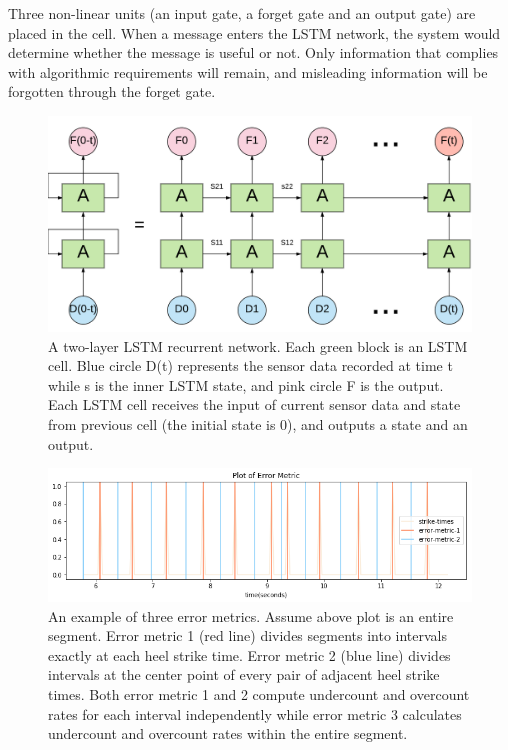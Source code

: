 \documentclass[11pt]{article}
\begin{document}
Three non-linear units (an input gate, a forget gate and an output gate) are placed in the cell. When a message enters the LSTM network, the system would determine whether the message is useful or not. Only information that complies with algorithmic requirements will remain, and misleading information will be forgotten through the forget gate.


\begin{figure}[ht]
\centering
\includegraphics[scale=0.3]{LSTM3}
\caption{A two-layer LSTM recurrent network. Each green block is an LSTM cell. Blue circle D(t) represents the sensor data recorded at time t while s is the inner LSTM state, and pink circle F is the output. Each LSTM cell receives the input of current sensor data and state from previous cell (the initial state is 0), and outputs a state and an output.}
\label{fig:LSTM}
\end{figure}

\begin{figure}[ht]
\centering
\includegraphics[scale=0.6]{error_metric}
\caption{An example of three error metrics. Assume above plot is an entire segment. Error metric 1 (red line) divides segments into intervals exactly at each heel strike time. Error metric 2 (blue line) divides intervals at the center point of every pair of adjacent heel strike times. Both error metric 1 and 2 compute undercount and overcount rates for each interval independently while error metric 3 calculates undercount and overcount rates within the entire segment.}
\label{fig:error_metric}
\end{figure}
\end{document}
